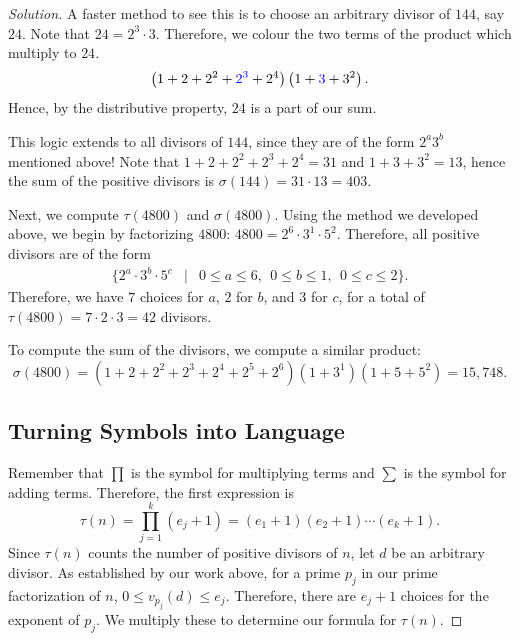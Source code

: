 \begin{proof}[Solution]
A faster method to see this is to choose an arbitrary divisor of $144$, say $24$. Note that $24=2^3\cdot 3$. Therefore, we colour the two terms of the product which multiply to $24$. $$\left(1+2+2^2+\color{blue}2^3\color{black}+2^4\right)\left(1+\color{blue}3\color{black}+3^2\right).$$  
Hence, by the distributive property, $24$ is a part of our sum.

This logic extends to all divisors of $144$, since they are of the form $2^a3^b$ mentioned above! Note that $1+2+2^2+2^3+2^4=31$ and $1+3+3^2=13$, hence the sum of the positive divisors is $\sigma(144)=31\cdot 13=\boxed{403}$.

Next, we compute $\tau(4800)$ and $\sigma(4800)$. Using the method we developed above, we begin by factorizing $4800$: $4800=2^6\cdot 3^1\cdot 5^2$. Therefore, all positive divisors are of the form \begin{eqnarray*}\{2^a\cdot 3^b\cdot 5^c &|& 0\le a\le 6,\:\: 0\le b\le 1,\:\: 0\le c\le 2\}. \end{eqnarray*}
Therefore, we have $7$ choices for $a$, $2$ for $b$, and $3$ for $c$, for a total of $\tau(4800)=7\cdot 2\cdot 3=\boxed{42}$ divisors.

To compute the sum of the divisors, we compute a similar product:  $$\sigma(4800)=(1+2+2^2+2^3+2^4+2^5+2^6)(1+3^1)(1+5+5^2)=\boxed{15,748}.$$ 
\clearpage


\subsection*{Turning Symbols into Language}
Remember that $\prod$ is the symbol for multiplying terms and $\sum$ is the symbol for adding terms. Therefore, the first expression is $$\tau(n)=\prod_{j=1}^{k}\left(e_j+1\right)=\left(e_1+1\right)\left(e_2+1\right)\cdots \left(e_k+1\right).$$ Since $\tau(n)$ counts the number of positive divisors of $n$, let $d$ be an arbitrary divisor. As established by our work above, for a prime $p_j$ in our prime factorization of $n$, $0\le v_{p_j}(d)\le e_j$. Therefore, there are $e_j+1$ choices for the exponent of $p_j$. We multiply these to determine our formula for $\tau(n)$. \end{proof}
\clearpage

